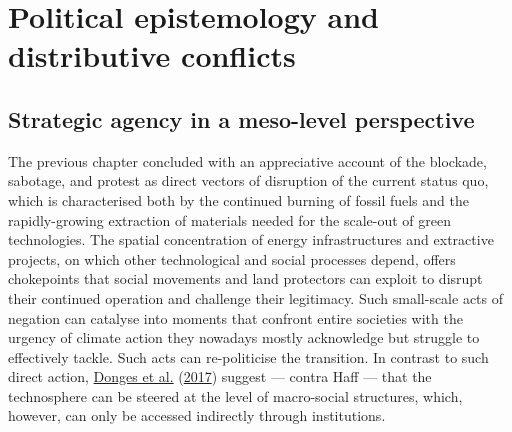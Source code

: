 \documentclass[a4paper, nobind]{templates/ociamthesis}
\begin{document}
\hypertarget{political-epistemology-and-distributive-conflicts}{%
\chapter{Political epistemology and distributive conflicts}\label{political-epistemology-and-distributive-conflicts}}

\minitoc

\hypertarget{strategic-agency-in-a-meso-level-perspective}{%
\section{Strategic agency in a meso-level perspective}\label{strategic-agency-in-a-meso-level-perspective}}

The previous chapter concluded with an appreciative account of the blockade, sabotage, and protest as direct vectors of disruption of the current status quo, which is characterised both by the continued burning of fossil fuels and the rapidly-growing extraction of materials needed for the scale-out of green technologies. The spatial concentration of energy infrastructures and extractive projects, on which other technological and social processes depend, offers chokepoints that social movements and land protectors can exploit to disrupt their continued operation and challenge their legitimacy. Such small-scale acts of negation can catalyse into moments that confront entire societies with the urgency of climate action they nowadays mostly acknowledge but struggle to effectively tackle. Such acts can re-politicise the transition. In contrast to such direct action, \protect\hyperlink{ref-donges_technosphere_2017}{Donges et al.} (\protect\hyperlink{ref-donges_technosphere_2017}{2017}) suggest --- contra Haff --- that the technosphere can be steered at the level of macro-social structures, which, however, can only be accessed indirectly through institutions.
\end{document}
